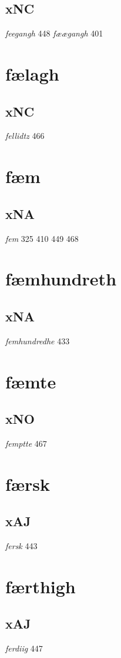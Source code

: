 \documentclass[a4paper,twocolumn]{article}
\begin{document}
\subsection{xNC}
\label{sec:org6ca3702}
\emph{feegangh} 448 \emph{fæægangh} 401 
\section{fælagh}
\label{sec:orgc574a44}
\subsection{xNC}
\label{sec:orgf86d7da}
\emph{fellidtz} 466 
\section{fæm}
\label{sec:orgc415a13}
\subsection{xNA}
\label{sec:orga1fa350}
\emph{fem} 325 410 449 468 
\section{fæmhundreth}
\label{sec:org1a7c791}
\subsection{xNA}
\label{sec:orgf5801fe}
\emph{femhundredhe} 433 
\section{fæmte}
\label{sec:org63d62f9}
\subsection{xNO}
\label{sec:org992d1b8}
\emph{femptte} 467 
\section{færsk}
\label{sec:org19fd2a4}
\subsection{xAJ}
\label{sec:org9888942}
\emph{fersk} 443 
\section{færthigh}
\label{sec:orga97f0e1}
\subsection{xAJ}
\label{sec:org0ee44cb}
\emph{ferdiig} 447 
\end{document}
